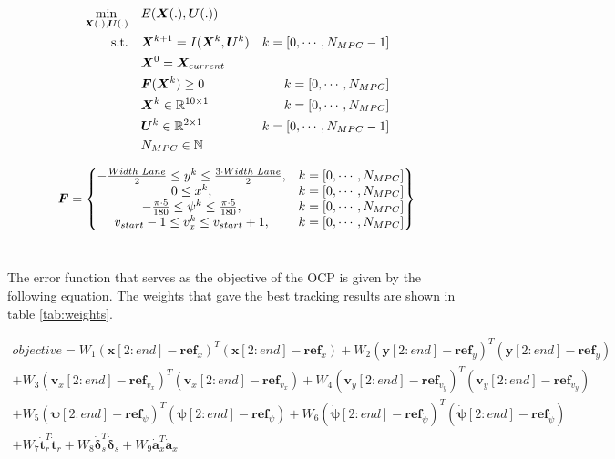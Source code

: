 \begin{equation}\label{opt:tracking}
\begin{aligned}
\min_{\bm{X}(.),\bm{U}(.)} \quad &  E(\bm{X}(.),\bm{U}(.)) \\
\textrm{s.t.} \quad & \bm{X}^{k+1} = I(\bm{X}^{k}, \bm{U}^{k}) & k = [0,\cdots, N_{MPC}-1]\\
& \bm{X}^{0} = \bm{X}_{current} \\
& \bm{F}(\bm{X}^{k}) \geq 0	& k = [0,\cdots, N_{MPC}]\\
& \bm{X}^{k}\in \mathbb{R}^{10\times 1}  & k = [0,\cdots, N_{MPC}]\\
& \bm{U}^{k}\in \mathbb{R}^{2\times 1} \hspace{3 mm} & k = [0,\cdots, N_{MPC}-1]\\
&  N_{MPC} \in \mathbb{N}
\end{aligned}
\end{equation}

\begin{equation}\label{eq:F_MPC}
\bm{F} =
\begin{Bmatrix}
-\frac{Width\hspace{1mm}Lane}{2} \leq y^k \leq \frac{3\cdot Width\hspace{1mm}Lane}{2}, & k = [0,\cdots, N_{MPC}] \\
0 \leq x^k, & k = [0,\cdots, N_{MPC}] \\
-\frac{\pi\cdot 5}{180} \leq \psi^k \leq \frac{\pi\cdot 5}{180}, & k = [0,\cdots, N_{MPC}] \\
v_{start}-1 \leq v_x^k \leq v_{start}+1, & k = [0,\cdots, N_{MPC}]
\end{Bmatrix}
\end{equation}\

The error function that serves as the objective of the OCP is given by the following equation. The weights that gave the best tracking results are shown in table \ref{tab:weights}.

\begin{multline*} 
objective=W_1(\bm{x}[2:end]-\bm{ref}_x)^T(\bm{x}[2:end]-\bm{ref}_x)+W_2(\bm{y}[2:end]-\bm{ref}_y)^T(\bm{y}[2:end]-\bm{ref}_y)\\
+W_3(\bm{v}_x[2:end]-\bm{ref}_{v_x})^T(\bm{v}_x[2:end]-\bm{ref}_{v_x})+W_4(\bm{v}_y[2:end]-\bm{ref}_{v_y})^T(\bm{v}_y[2:end]-\bm{ref}_{v_y})\\+W_5(\bm{\psi}[2:end]-\bm{ref}_{\psi})^T(\bm{\psi}[2:end]-\bm{ref}_\psi)
+W_6(\bm{\dot{\psi}}[2:end]-\bm{ref}_{\dot{\psi}})^T(\bm{\dot{\psi}}[2:end]-\bm{ref}_{\dot{\psi}})\\ + W_7\dot{\bm{t}}_r^T\dot{\bm{t}}_r+W_8\dot{\bm{\delta}}_s^T\dot{\bm{\delta}}_s + W_9\dot{\bm{a}}_x^T\dot{\bm{a}}_x
\end{multline*}

